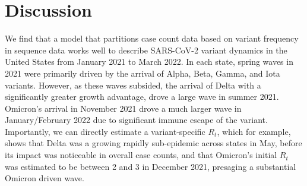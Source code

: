 %

\section{Discussion}

We find that a model that partitions case count data based on variant frequency in sequence data works well to describe SARS-CoV-2 variant dynamics in the United States from January 2021 to March 2022.
In each state, spring waves in 2021 were primarily driven by the arrival of Alpha, Beta, Gamma, and Iota variants.
However, as these waves subsided, the arrival of Delta with a significantly greater growth advantage, drove a large wave in summer 2021.
Omicron's arrival in November 2021 drove a much larger wave in January/February 2022 due to significant immune escape of the variant.
Importantly, we can directly estimate a variant-specific $R_{t}$, which for example, shows that Delta was a growing rapidly sub-epidemic across states in May, before its impact was noticeable in overall case counts, and that Omicron's initial $R_{t}$ was estimated to be between 2 and 3 in December 2021, presaging a substantial Omicron driven wave.

